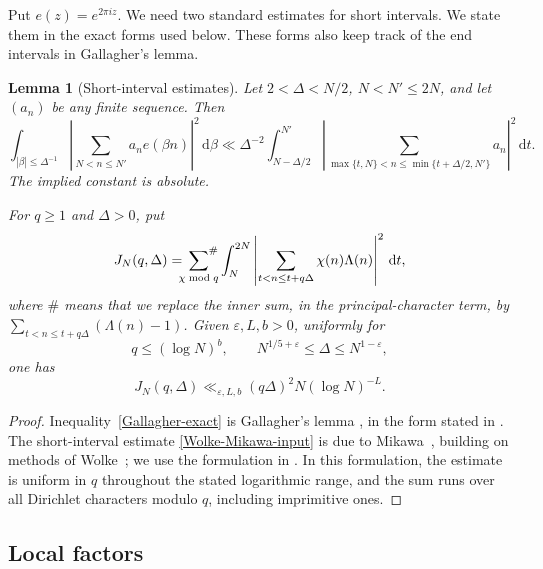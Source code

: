 \documentclass[12pt,reqno]{amsart}
\numberwithin{equation}{section}
\theoremstyle{plain}
\newtheorem{lemma}[theorem]{Lemma}
\theoremstyle{remark}
\newcommand{\dif}{\mathrm{d}}
\begin{document}
Put $e(z)=e^{2\pi iz}$.  We need two standard estimates for short intervals.  We state them in
the exact forms used below.  These forms also keep track of the end
intervals in Gallagher's lemma.

\begin{lemma}[Short-interval estimates]\label{lem:short-interval-input}
Let $2<\Delta<N/2$, $N<N'\leq2N$, and let  $(a_n)$ be any finite
sequence.  Then
\begin{equation}\label{Gallagher-exact}
 \int_{|\beta|\leq\Delta^{-1}}
 \left|\sum_{N<n\leq N'}a_ne(\beta n)\right|^2\,\dif\beta
 \ll \Delta^{-2}
 \int_{N-\Delta/2}^{N'}
 \left|
 \sum_{\max\{t,N\}<n\leq\min\{t+\Delta/2,N'\}}a_n
 \right|^2\,\dif t.
\end{equation}
The implied constant is absolute.

For $q\geq1$ and $\Delta>0$, put
\begin{equation}\label{J-definition}
 J_N(q,\Delta)=
 \sideset{}{^{\#}}\sum_{\chi\bmod q}\int_N^{2N}
 \left|\sum_{t<n\leq t+q\Delta}
       \chi(n)\Lambda(n)\right|^2\,\dif t,
\end{equation}
where $\#$ means that we replace the inner sum, in the principal-character term, by
$\sum_{t<n\leq t+q\Delta}(\Lambda(n)-1)$.
Given $\varepsilon,L,b>0$, uniformly for
\begin{equation*}\label{Wolke-Mikawa-range}
 q\leq(\log N)^b,
 \qquad N^{1/5+\varepsilon}\leq\Delta\leq N^{1-\varepsilon},
\end{equation*}
one has
\begin{equation}\label{Wolke-Mikawa-input}
 J_N(q,\Delta)\ll_{\varepsilon,L,b}
 (q\Delta)^2N(\log N)^{-L}.
\end{equation}
\end{lemma}

\begin{proof}
Inequality~\eqref{Gallagher-exact} is Gallagher's lemma
\cite{Gallagher1970}, in the form stated in
\cite[Lemma~1]{BaierZhao2007}.  The short-interval estimate
\eqref{Wolke-Mikawa-input} is due to Mikawa~\cite{Mikawa1991},
building on methods of Wolke~\cite{Wolke1989}; we use the formulation
in \cite[Lemma~2]{BaierZhao2007}.  In this formulation, the estimate is
uniform in $q$ throughout the stated logarithmic range, and the sum runs
over all Dirichlet characters modulo $q$, including imprimitive ones.
\end{proof}

\subsection{Local factors}
\end{document}
